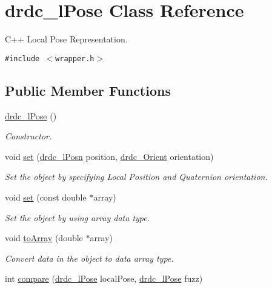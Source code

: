 \hypertarget{classdrdc__lPose}{
\section{drdc\_\-lPose Class Reference}
\label{classdrdc__lPose}
}
C++ Local Pose Representation.  


{\tt \#include $<$wrapper.h$>$}

\subsection*{Public Member Functions}
\begin{CompactItemize}
\item 
\hyperlink{classdrdc__lPose_88390e6eb880184af556cb7692706279}{drdc\_\-lPose} ()
\begin{CompactList}\small\item\em Constructor. \item\end{CompactList}\item 
void \hyperlink{classdrdc__lPose_014c2e1bca0662a9f7d1526d5398d82e}{set} (\hyperlink{classdrdc__lPosn}{drdc\_\-lPosn} position, \hyperlink{classdrdc__Orient}{drdc\_\-Orient} orientation)
\begin{CompactList}\small\item\em Set the object by specifying Local Position and Quaternion orientation. \item\end{CompactList}\item 
void \hyperlink{classdrdc__lPose_706422e4993b89982acdbd447f3aed38}{set} (const double $\ast$array)
\begin{CompactList}\small\item\em Set the object by using array data type. \item\end{CompactList}\item 
void \hyperlink{classdrdc__lPose_2279cd2f27850888c3fdfea0ca14e4d4}{toArray} (double $\ast$array)
\begin{CompactList}\small\item\em Convert data in the object to data array type. \item\end{CompactList}\item 
int \hyperlink{classdrdc__lPose_0b31eb0f050398db82c6d942fc190cfd}{compare} (\hyperlink{classdrdc__lPose}{drdc\_\-lPose} localPose, \hyperlink{classdrdc__lPose}{drdc\_\-lPose} fuzz)

\end{CompactItemize}
